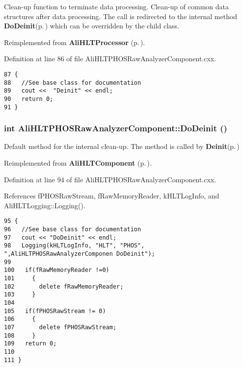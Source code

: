 Clean-up function to terminate data processing. Clean-up of common data structures after data processing. The call is redirected to the internal method {\bf Do\-Deinit}{\rm (p.\,\pageref{classAliHLTPHOSRawAnalyzerComponent_a6})} which can be overridden by the child class. 

Reimplemented from {\bf Ali\-HLTProcessor} {\rm (p.\,\pageref{classAliHLTProcessor_a3})}.

Definition at line 86 of file Ali\-HLTPHOSRaw\-Analyzer\-Component.cxx.

\footnotesize\begin{verbatim}87 {
88   //See base class for documentation
89   cout <<  "Deinit" << endl;
90   return 0;
91 }
\end{verbatim}\normalsize 


\subsubsection{\setlength{\rightskip}{0pt plus 5cm}int Ali\-HLTPHOSRaw\-Analyzer\-Component::Do\-Deinit ()\hspace{0.3cm}{\tt  [virtual]}}\label{classAliHLTPHOSRawAnalyzerComponent_a6}


Default method for the internal clean-up. The method is called by {\bf Deinit}{\rm (p.\,\pageref{classAliHLTPHOSRawAnalyzerComponent_a5})} 

Reimplemented from {\bf Ali\-HLTComponent} {\rm (p.\,\pageref{classAliHLTComponent_b6})}.

Definition at line 94 of file Ali\-HLTPHOSRaw\-Analyzer\-Component.cxx.

References f\-PHOSRaw\-Stream, f\-Raw\-Memory\-Reader, k\-HLTLog\-Info, and Ali\-HLTLogging::Logging().

\footnotesize\begin{verbatim}95 {
96   //See base class for documentation
97   cout << "DoDeinit" << endl;
98   Logging(kHLTLogInfo, "HLT", "PHOS", ",AliHLTPHOSRawAnalyzerComponen DoDeinit");
99 
100   if(fRawMemoryReader !=0)
101     {
102       delete fRawMemoryReader;
103     }
104     
105   if(fPHOSRawStream != 0)
106     {
107       delete fPHOSRawStream;
108     }
109   return 0;
110 
111 }
\end{verbatim}\normalsize 


